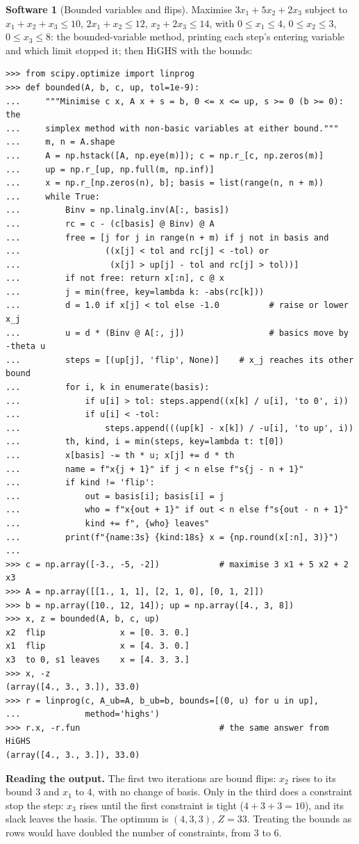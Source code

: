 \documentclass[11pt,a4paper]{article}
\numberwithin{equation}{section}
\theoremstyle{definition}
\newtheorem{software}[thm]{Software}
\begin{document}
\begin{software}[Bounded variables and flips]
\label{sw:bounded}
Maximise $3x_1 + 5x_2 + 2x_3$ subject to $x_1 + x_2 + x_3 \leq 10$, $2x_1 + x_2 \leq 12$, $x_2 + 2x_3 \leq 14$, with $0 \leq x_1 \leq 4$, $0 \leq x_2 \leq 3$, $0 \leq x_3 \leq 8$: the bounded-variable method, printing each step's entering variable and which limit stopped it; then HiGHS with the bounds:
{\small\begin{verbatim}
>>> from scipy.optimize import linprog
>>> def bounded(A, b, c, up, tol=1e-9):
...     """Minimise c x, A x + s = b, 0 <= x <= up, s >= 0 (b >= 0): the
...     simplex method with non-basic variables at either bound."""
...     m, n = A.shape
...     A = np.hstack([A, np.eye(m)]); c = np.r_[c, np.zeros(m)]
...     up = np.r_[up, np.full(m, np.inf)]
...     x = np.r_[np.zeros(n), b]; basis = list(range(n, n + m))
...     while True:
...         Binv = np.linalg.inv(A[:, basis])
...         rc = c - (c[basis] @ Binv) @ A
...         free = [j for j in range(n + m) if j not in basis and
...                 ((x[j] < tol and rc[j] < -tol) or
...                  (x[j] > up[j] - tol and rc[j] > tol))]
...         if not free: return x[:n], c @ x
...         j = min(free, key=lambda k: -abs(rc[k]))
...         d = 1.0 if x[j] < tol else -1.0          # raise or lower x_j
...         u = d * (Binv @ A[:, j])                 # basics move by -theta u
...         steps = [(up[j], 'flip', None)]    # x_j reaches its other bound
...         for i, k in enumerate(basis):
...             if u[i] > tol: steps.append((x[k] / u[i], 'to 0', i))
...             if u[i] < -tol:
...                 steps.append(((up[k] - x[k]) / -u[i], 'to up', i))
...         th, kind, i = min(steps, key=lambda t: t[0])
...         x[basis] -= th * u; x[j] += d * th
...         name = f"x{j + 1}" if j < n else f"s{j - n + 1}"
...         if kind != 'flip':
...             out = basis[i]; basis[i] = j
...             who = f"x{out + 1}" if out < n else f"s{out - n + 1}"
...             kind += f", {who} leaves"
...         print(f"{name:3s} {kind:18s} x = {np.round(x[:n], 3)}")
...
>>> c = np.array([-3., -5, -2])            # maximise 3 x1 + 5 x2 + 2 x3
>>> A = np.array([[1., 1, 1], [2, 1, 0], [0, 1, 2]])
>>> b = np.array([10., 12, 14]); up = np.array([4., 3, 8])
>>> x, z = bounded(A, b, c, up)
x2  flip               x = [0. 3. 0.]
x1  flip               x = [4. 3. 0.]
x3  to 0, s1 leaves    x = [4. 3. 3.]
>>> x, -z
(array([4., 3., 3.]), 33.0)
>>> r = linprog(c, A_ub=A, b_ub=b, bounds=[(0, u) for u in up],
...             method='highs')
>>> r.x, -r.fun                            # the same answer from HiGHS
(array([4., 3., 3.]), 33.0)
\end{verbatim}}
\textbf{Reading the output.} The first two iterations are bound flips: $x_2$ rises to its bound $3$ and $x_1$ to $4$, with no change of basis. Only in the third does a constraint stop the step: $x_3$ rises until the first constraint is tight ($4 + 3 + 3 = 10$), and its slack leaves the basis. The optimum is $(4, 3, 3)$,
$Z = 33$. Treating the bounds as rows would have doubled the number of constraints, from $3$ to $6$.


\end{software}
\end{document}
